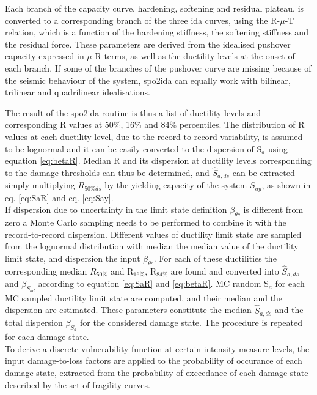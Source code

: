 Each branch of the capacity curve, hardening, softening and residual plateau, is converted to a corresponding branch of the three ida curves, using the R-$\mu$-T relation, which is a function of the hardening stiffness, the softening stiffness and the residual force. These parameters are derived from the idealised pushover capacity expressed in $\mu$-R terms, as well as the ductility levels at the onset of each branch. If some of the branches of the pushover curve are missing because of the seismic behaviour of the system, spo2ida can equally work with bilinear, trilinear and quadrilinear idealisations.

The result of the spo2ida routine is thus a list of ductility levels and corresponding R values at 50\%, 16\% and 84\% percentiles. The distribution of R values at each ductility level, due to the record-to-record variability, is assumed to be lognormal and it can be easily converted to the dispersion of S$_a$ using equation \ref{eq:betaR}. 
Median R and its dispersion at ductility levels corresponding to the damage thresholds can thus be determined, and $\hat{S}_{a,ds}$ can be extracted simply multiplying $R_{50\% ds}$ by the yielding capacity of the system $S_{ay}$, as shown in eq. \ref{eq:SaR} and eq. \ref{eq:Say}.\\

If dispersion due to uncertainty in the limit state definition $\beta_{\theta c}$ is different from zero a Monte Carlo sampling needs to be performed to combine it with the record-to-record dispersion. Different values of ductility limit state are sampled from the  lognormal distribution with median the median value of the ductility limit state, and dispersion the input $\beta_{\theta c}$. For each of these ductilities the corresponding median $R_{50\%}$ and R$_{16\%}$, R$_{84\%}$ are found and converted into $\hat{S}_{a,ds}$ and $\beta_S_{a d}$ according to equation \ref{eq:SaR} and \ref{eq:betaR}. MC random S$_a$ for each MC sampled ductility limit state are computed, and their median and the dispersion are estimated. These parameters constitute the median $\hat{S}_{a,ds}$ and the total dispersion $\beta_{S_a}$ for the considered damage state. The procedure is repeated for each damage state.\\

To derive a discrete vulnerability function at certain intensity measure levels, the input damage-to-loss factors are applied to the probability of occurance of each damage state, extracted from the probability of exceedance of each damage state described by the set of fragility curves. 

